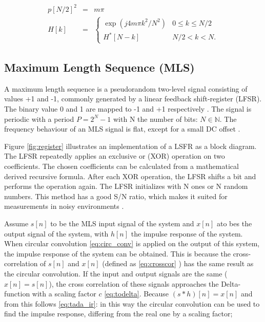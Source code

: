 \begin{eqnarray}
\label{eq:OATSPm} p[N/2]^{2} &=& m \pi\\
\label{eq:OATSP} H[k]&=&\left\{
\begin{array}{ll}
\exp(j4m \pi k^{2}/N^{2})& 0 \leq k \leq N/2\\
H^{*} [N-k] & N/2 < k < N.
\end{array}
\right.
\end{eqnarray}

\clearpage
\subsection{Maximum Length Sequence (MLS)}
A maximum length sequence is a pseudorandom two-level signal consisting of values +1 and -1, commonly generated by a linear feedback shift-register (LFSR).
The binary value 0 and 1 are mapped to -1 and +1 respectively \cite{hee2003}.
The signal is periodic with a period $P=2^N-1$ with N the number of bits: $N\in\mathbb{N}$.
The frequency behaviour of an MLS signal is flat, except for a small DC offset \cite{Thomas2006}.

Figure \ref{fig:register} illustrates an implementation of a LSFR as a block diagram. 
The LFSR repeatedly applies an exclusive or (XOR) operation on two coefficients.
The chosen coefficients can be calculated from a mathematical derived recursive formula.
After each XOR operation, the LFSR shifts a bit and performs the operation again. 
The LFSR initializes with N ones or N random numbers. 
This method has a good S/N ratio, which makes it suited for measurements in noisy environments \cite{hee2003}. 

Assume $s[n]$ to be the MLS input signal of the system and $x[n]$ ato bes the output signal of the system, with $h[n]$ the impulse response of the system.
When circular convolution \eqref{eq:circ_conv} \cite[p.~439]{book:dsp} is applied on the output of this system, the impulse response of the system can be obtained.
This is because the cross-correlation of $s[n]$ and $x[n]$ (defined as \eqref{eq:crosscor} \cite[p.~228-229]{girod2001signals}) has the same result as the circular convolution.
If the input and output signals are the same ($x[n]=s[n]$), the cross correlation of these signals approaches the Delta-function with a scaling factor $c$ \eqref{eq:todelta}.
Because $(s*h)[n]=x[n]$ and from this follows \eqref{eq:tada_ir}: in this way the circular convolution can be used to find the impulse response, differing from the real one by a scaling factor;

